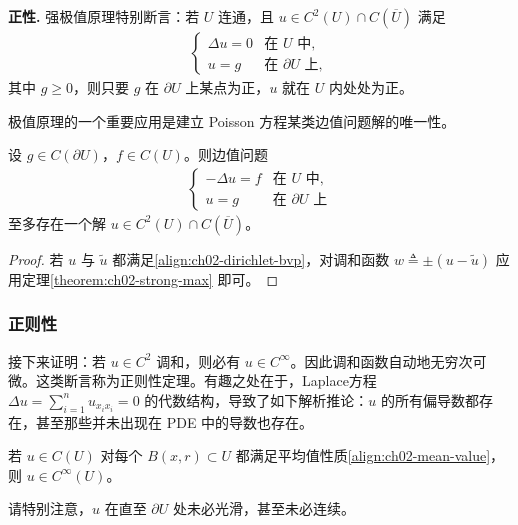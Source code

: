 \documentclass[../../main.tex]{subfiles}
\begin{document}
\textbf{正性.} 强极值原理特别断言：若 $U$ 连通，且 $u\in C^2(U)\cap C(\overline{U})$ 满足
\begin{align*}
\begin{cases}
\Delta u=0 & \text{在 }U\text{ 中},\\
u=g & \text{在 }\partial U\text{ 上},
\end{cases}
\end{align*}
其中 $g\geqslant 0$，则只要 $g$ 在 $\partial U$ 上某点为正，$u$ 就在 $U$ 内处处为正。

极值原理的一个重要应用是建立 Poisson 方程某类边值问题解的唯一性。

\begin{theorem}[唯一性]\label{theorem:ch02-uniqueness}设 $g\in C(\partial U)$，$f\in C(U)$。则边值问题
\begin{align}\label{align:ch02-dirichlet-bvp}
\begin{cases}
-\Delta u=f & \text{在 }U\text{ 中},\\
u=g & \text{在 }\partial U\text{ 上}
\end{cases}
\end{align}
至多存在一个解 $u\in C^2(U)\cap C(\overline{U})$。
\end{theorem}

\begin{proof}
若 $u$ 与 $\widetilde{u}$ 都满足\eqref{align:ch02-dirichlet-bvp}，对调和函数 $w\triangleq\pm(u-\widetilde{u})$ 应用定理\cref{theorem:ch02-strong-max} 即可。
\end{proof}

\subsubsection{正则性}

接下来证明：若 $u\in C^2$ 调和，则必有 $u\in C^\infty$。因此调和函数自动地无穷次可微。这类断言称为正则性定理。有趣之处在于，Laplace方程 $\Delta u=\sum_{i=1}^n u_{x_i x_i}=0$ 的代数结构，导致了如下解析推论：$u$ 的所有偏导数都存在，甚至那些并未出现在 PDE 中的导数也存在。

\begin{theorem}[光滑性]\label{theorem:ch02-smoothness}若 $u\in C(U)$ 对每个 $B(x,r)\subset U$ 都满足平均值性质\eqref{align:ch02-mean-value}，则 $u\in C^\infty(U)$。
\end{theorem}

请特别注意，$u$ 在直至 $\partial U$ 处未必光滑，甚至未必连续。
\end{document}
